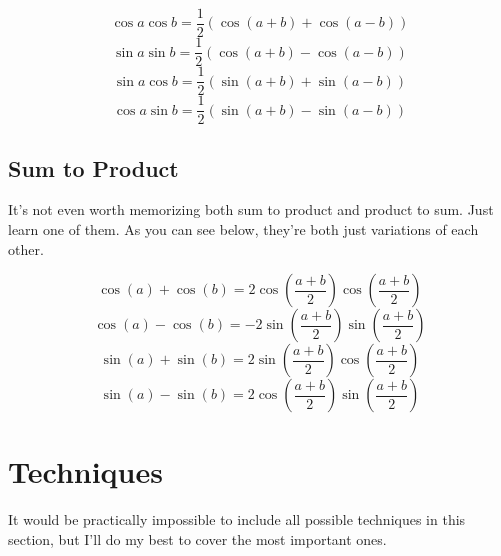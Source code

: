 \documentclass[11pt]{scrartcl}
\begin{document}
\begin{theorem}
$$\cos{a}\cos{b} = \frac{1}{2}(\cos{(a+b)}+\cos{(a-b)})$$
$$\sin{a}\sin{b} = \frac{1}{2}(\cos{(a+b)}-\cos{(a-b)})$$
$$\sin{a}\cos{b} = \frac{1}{2}(\sin{(a+b)}+\sin{(a-b)})$$
$$\cos{a}\sin{b} = \frac{1}{2}(\sin{(a+b)}-\sin{(a-b)})$$
\end{theorem}

\subsection{Sum to Product}

\vspace{5mm}
\noindent It's not even worth memorizing both sum to product and product to sum. Just learn one of them. As you can see below, they're both just variations of each other.

\begin{theorem}
$$\cos{(a)}+\cos{(b)} = 2\cos{(\frac{a+b}{2})}\cos{(\frac{a+b}{2})}$$
$$\cos{(a)}-\cos{(b)} = -2\sin{(\frac{a+b}{2})}\sin{(\frac{a+b}{2})}$$
$$\sin{(a)}+\sin{(b)} = 2\sin{(\frac{a+b}{2})}\cos{(\frac{a+b}{2})}$$
$$\sin{(a)}-\sin{(b)} = 2\cos{(\frac{a+b}{2})}\sin{(\frac{a+b}{2})}$$
\end{theorem}

\pagebreak

\vspace{5mm}
\section{Techniques}
It would be practically impossible to include all possible techniques in this section, but I'll do my best to cover the most important ones.
\end{document}
